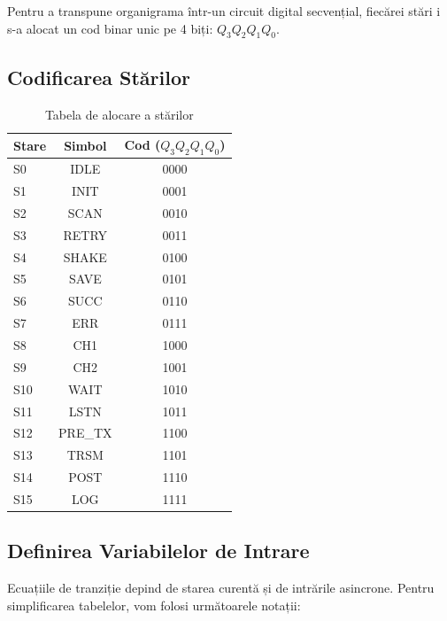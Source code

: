 Pentru a transpune organigrama într-un circuit digital secvențial, fiecărei stări i s-a alocat un cod binar unic pe 4 biți: $Q_3 Q_2 Q_1 Q_0$.

\subsection{Codificarea Stărilor}

\begin{table}[H]
    \centering
    \begin{tabular}{|l|c|c|}
        \hline
        \textbf{Stare} & \textbf{Simbol} & \textbf{Cod ($Q_3 Q_2 Q_1 Q_0$)} \\
        \hline
        S0 & IDLE & 0000 \\
        \hline
        S1 & INIT & 0001 \\
        \hline
        S2 & SCAN & 0010 \\
        \hline
        S3 & RETRY & 0011 \\
        \hline
        S4 & SHAKE & 0100 \\
        \hline
        S5 & SAVE & 0101 \\
        \hline
        S6 & SUCC & 0110 \\
        \hline
        S7 & ERR & 0111 \\
        \hline
        S8 & CH1 & 1000 \\
        \hline
        S9 & CH2 & 1001 \\
        \hline
        S10 & WAIT & 1010 \\
        \hline
        S11 & LSTN & 1011 \\
        \hline
        S12 & PRE\_TX & 1100 \\
        \hline
        S13 & TRSM & 1101 \\
        \hline
        S14 & POST & 1110 \\
        \hline
        S15 & LOG & 1111 \\
        \hline
    \end{tabular}
    \caption{Tabela de alocare a stărilor}
\end{table}

\subsection{Definirea Variabilelor de Intrare}

Ecuațiile de tranziție depind de starea curentă și de intrările asincrone. Pentru simplificarea tabelelor, vom folosi următoarele notații:

